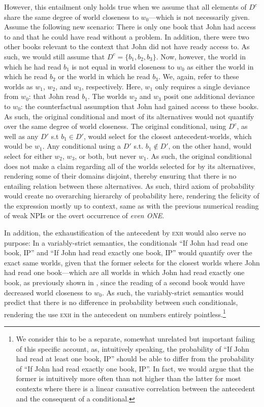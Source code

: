 However, this entailment only holds true when we assume that all elements of $D^c$ share the same degree of world closeness to $w_0$---which is not necessarily given. Assume the following new scenario: There is only one book that John had access to and that he could have read without a problem. In addition, there were two other books relevant to the context that John did not have ready access to. As such, we would still assume that $D^c=\{b_1,b_2,b_3\}$. Now, however, the world in which he had read $b_1$ is not equal in world closeness to $w_0$ as either the world in which he read $b_2$ or the world in which he read $b_3$. We, again, refer to these worlds as $w_1$, $w_2$, and $w_3$, respectively. Here, $w_1$ only requires a single deviance from $w_0$: that John read $b_1$. The worlds $w_2$ and $w_3$ posit one additional deviance to $w_0$: the counterfactual assumption that John had gained access to these books. As such, the original conditional and most of its alternatives would not quantify over the same degree of world closeness. The original conditional, using $D^c$, as well as any $D'$ s.t $b_1\in D'$, would select for the closest antecedent-worlds, which would be $w_1$. Any conditional using a $D'$ s.t. $b_1\not\in D'$, on the other hand, would select for either $w_2$, $w_3$, or both, but never $w_1$. As such, the original conditional does not make a claim regarding all of the worlds selected for by its alternatives, rendering some of their domains disjoint, thereby ensuring that there is no entailing relation between these alternatives. As such,  third axiom of probability would create no overarching hierarchy of probability here, rendering the felicity of the expression mostly up to context, same as with the previous numerical reading of weak NPIs or the overt occurrence of \textit{even \MakeUppercase{one}}.

In addition, the exhaustification of the antecedent by {\scshape exh} would also serve no purpose: In a variably-strict semantics, the conditionals \enquote{If John had read one book, IP} and \enquote{If John had read exactly one book, IP} would quantify over the exact same worlds, given that the former selects for the closest worlds where John had read one book---which are all worlds in which John had read exactly one book, as previously shown in , since the reading of a second book would have decreased world closeness to $w_0$. As such, the variably-strict semantics would predict that there is no difference in probability between such conditionals, rendering the use {\scshape exh} in the antecedent on numbers entirely pointless.\footnote{We consider this to be a separate, somewhat unrelated but important failing of this specific account, as, intuitively speaking, the probability of \enquote{If John had read at least one book, IP} should be able to differ from the probability of \enquote{If John had read exactly one book, IP}. In fact, we would argue that the former is intuitively more often than not higher than the latter for most contexts where there is a linear causative correlation between the antecedent and the consequent of a conditional.} 

